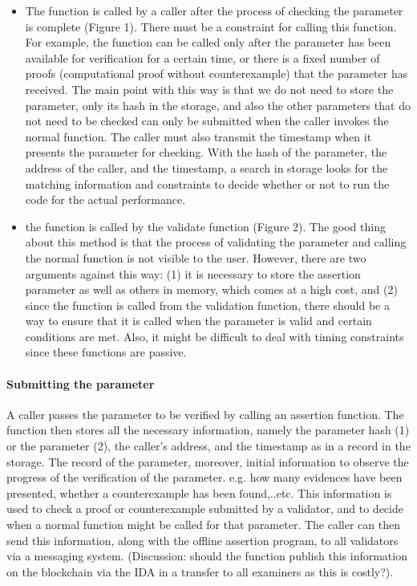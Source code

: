 \documentclass[runningheads]{llncs}
\begin{document}
\begin{itemize}
\item The function is called by a caller after the process of checking the parameter is complete (Figure 1). There must be a constraint for calling this function. For example, the function can be called only after the parameter has been available for verification for a certain time, or there is a fixed number of proofs (computational proof without counterexample) that the parameter has received. The main point with this way is that we do not need to store the parameter, only its hash in the storage, and also the other parameters that do not need to be checked can only be submitted when the caller invokes the normal function. The caller must also transmit the timestamp when it presents the parameter for checking. With the hash of the parameter, the address of the caller, and the timestamp, a search in storage looks for the matching information and constraints to decide whether or not to run the code for the actual performance.
\item the function is called by the validate function (Figure 2). The good thing about this method is that the process of validating the parameter and calling the normal function is not visible to the user. However, there are two arguments against this way: (1) it is necessary to store the assertion parameter as well as others in memory, which comes at a high cost, and (2) since the function is called from the validation function, there should be a way to ensure that it is called when the parameter is valid and certain conditions are met. Also, it might be difficult to deal with timing constraints since these functions are passive. 
\end{itemize}

\paragraph{Submitting the parameter} A caller passes the parameter to be verified by calling an assertion function. The function then stores all the necessary information, namely the parameter hash (1) or the parameter (2), the caller's address, and the timestamp as in a record in the storage.  The record of the parameter, moreover, initial information to observe the progress of the verification of the parameter. e.g. how many evidences have been presented, whether a counterexample has been found,..etc. This information is used to check a proof or  counterexample submitted by a validator, and to decide when a normal function might be called for that parameter. The caller can then send this information, along with the offline assertion program, to all validators via a messaging system. (Discussion: should the function publish this information on the blockchain via the IDA in a transfer to all examiners as this is costly?).
\end{document}
